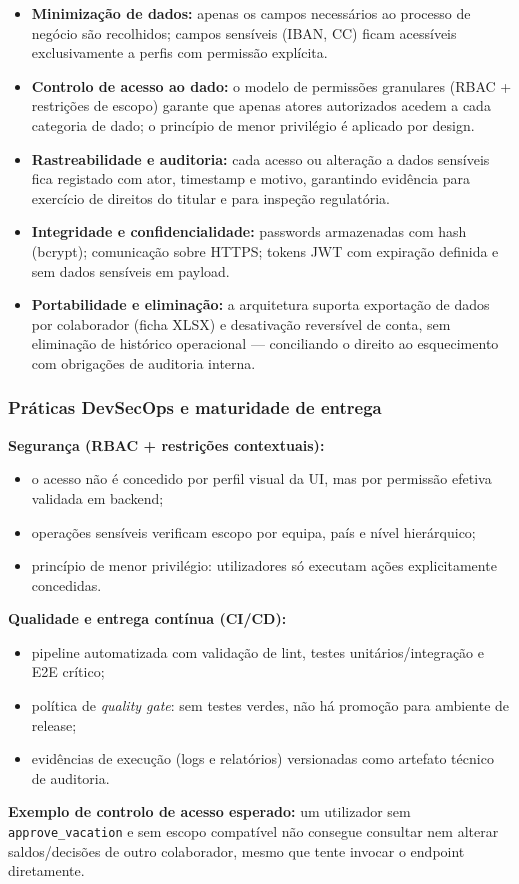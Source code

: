 \documentclass[11pt,a4paper,twoside]{article}
\begin{document}
\begin{itemize}
  \item \textbf{Minimização de dados:} apenas os campos necessários ao processo de negócio são recolhidos; campos sensíveis (IBAN, CC) ficam acessíveis exclusivamente a perfis com permissão explícita.
  \item \textbf{Controlo de acesso ao dado:} o modelo de permissões granulares (RBAC + restrições de escopo) garante que apenas atores autorizados acedem a cada categoria de dado; o princípio de menor privilégio é aplicado por design.
  \item \textbf{Rastreabilidade e auditoria:} cada acesso ou alteração a dados sensíveis fica registado com ator, timestamp e motivo, garantindo evidência para exercício de direitos do titular e para inspeção regulatória.
  \item \textbf{Integridade e confidencialidade:} passwords armazenadas com hash (bcrypt); comunicação sobre HTTPS; tokens JWT com expiração definida e sem dados sensíveis em payload.
  \item \textbf{Portabilidade e eliminação:} a arquitetura suporta exportação de dados por colaborador (ficha XLSX) e desativação reversível de conta, sem eliminação de histórico operacional — conciliando o direito ao esquecimento com obrigações de auditoria interna.
\end{itemize}

\subsubsection{Práticas DevSecOps e maturidade de entrega}

\textbf{Segurança (RBAC + restrições contextuais):}
\begin{itemize}
  \item o acesso não é concedido por perfil visual da UI, mas por permissão efetiva validada em backend;
  \item operações sensíveis verificam escopo por equipa, país e nível hierárquico;
  \item princípio de menor privilégio: utilizadores só executam ações explicitamente concedidas.
\end{itemize}

\textbf{Qualidade e entrega contínua (CI/CD):}
\begin{itemize}
  \item pipeline automatizada com validação de lint, testes unitários/integração e E2E crítico;
  \item política de \textit{quality gate}: sem testes verdes, não há promoção para ambiente de release;
  \item evidências de execução (logs e relatórios) versionadas como artefato técnico de auditoria.
\end{itemize}
\newpage
\begin{callout}
\textbf{Exemplo de controlo de acesso esperado:} um utilizador sem \texttt{approve\_vacation} e sem escopo compatível não consegue consultar nem alterar saldos/decisões de outro colaborador, mesmo que tente invocar o endpoint diretamente.
\end{callout}
\end{document}
